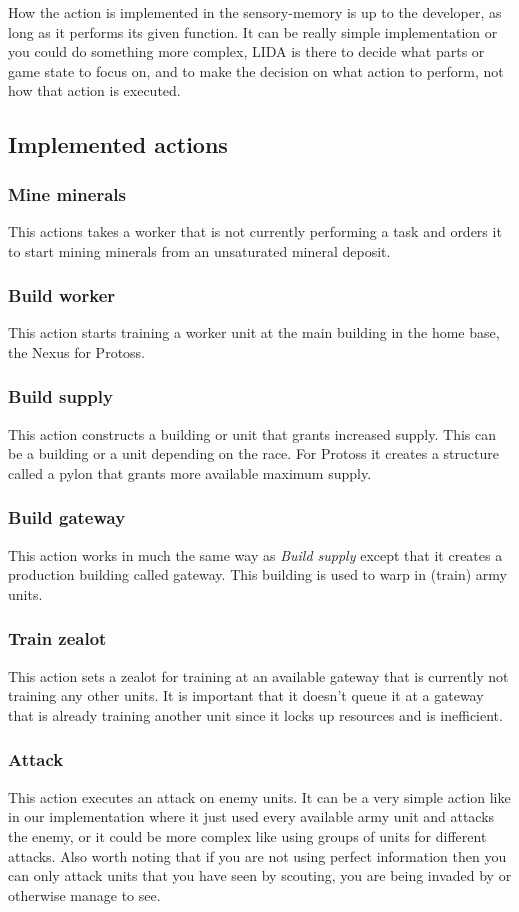 How the action is implemented in the sensory-memory is up to the developer, as long as it performs its given function. It can be really simple implementation or you could do something more complex, LIDA is there to decide what parts or game state to focus on, and to make the decision on what action to perform, not how that action is executed.

\subsection{Implemented actions}
\subsubsection{Mine minerals}
This actions takes a worker that is not currently performing a task and orders it to start mining minerals from an unsaturated mineral deposit.

\subsubsection{Build worker}
This action starts training a worker unit at the main building in the home base, the Nexus for Protoss.

\subsubsection{Build supply}
This action constructs a building or unit that grants increased supply. This can be a building or a unit depending on the race. For Protoss it creates a structure called a pylon that grants more available maximum supply.

\subsubsection{Build gateway}
This action works in much the same way as {\em Build supply} except that it creates a production building called gateway. This building is used to warp in (train) army units.

\subsubsection{Train zealot}
This action sets a zealot for training at an available gateway that is currently not training any other units. It is important that it doesn't queue it at a gateway that is already training another unit since it locks up resources and is inefficient.

\subsubsection{Attack}
This action executes an attack on enemy units. It can be a very simple action like in our implementation where it just used every available army unit and attacks the enemy, or it could be more complex like using groups of units for different attacks. Also worth noting that if you are not using perfect information then you can only attack units that you have seen by scouting, you are being invaded by or otherwise manage to see.
